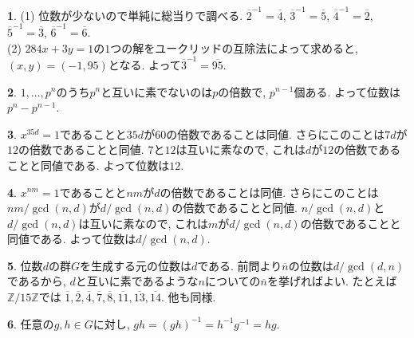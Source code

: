 \documentclass{amsart}
\theoremstyle{definition}
\newtheorem{ans}{}
\numberwithin{ans}{subsection}
\newcommand{\Z}[1]{\mathbb{Z}/#1\mathbb{Z}}
\begin{document}
\begin{ans}
  (1) 位数が少ないので単純に総当りで調べる.
  $\overline{2}^{-1} = \overline{4}$,
  $\overline{3}^{-1} = \overline{5}$,
  $\overline{4}^{-1} = \overline{2}$,
  $\overline{5}^{-1} = \overline{3}$,
  $\overline{6}^{-1} = \overline{6}$.\\
  (2) $284x + 3y = 1$の$1$つの解をユークリッドの互除法によって求めると,
  $(x, y) = (-1, 95)$となる. よって$\overline{3}^{-1} = \overline{95}$.
\end{ans}

\begin{ans}
  $1,..., p^n$のうち$p^n$と互いに素でないのは$p$の倍数で, $p^{n-1}$個ある.
  よって位数は$p^n - p^{n-1}$.
\end{ans}

\begin{ans}
  $x^{35d} = 1$であることと$35d$が$60$の倍数であることは同値.
  さらにこのことは$7d$が$12$の倍数であることと同値.
  $7$と$12$は互いに素なので, これは$d$が$12$の倍数であることと同値である.
  よって位数は$12$.
\end{ans}

\begin{ans}
  $x^{nm} = 1$であることと$nm$が$d$の倍数であることは同値.
  さらにこのことは$nm/\gcd(n, d)$が$d/\gcd(n, d)$の倍数であることと同値.
  $n/\gcd(n, d)$と$d/\gcd(n, d)$は互いに素なので, これは$m$が$d/\gcd(n, d)$の倍数であることと同値である.
  よって位数は$d/\gcd(n, d)$.
\end{ans}

\begin{ans}
  位数$d$の群$G$を生成する元の位数は$d$である.
  前問より$\overline{n}$の位数は$d/\gcd(d, n)$であるから,
  $d$と互いに素であるような$n$についての$\overline{n}$を挙げればよい.
  たとえば$\Z{15}$では
  $\overline{1}, \overline{2}, \overline{4}, \overline{7}, \overline{8}, \overline{11}, \overline{13}, \overline{14}$.
  他も同様.
\end{ans}

\begin{ans}
  任意の$g, h \in G$に対し,
  $gh = (gh)^{-1} = h^{-1}g^{-1} = hg$.
\end{ans}
\end{document}
